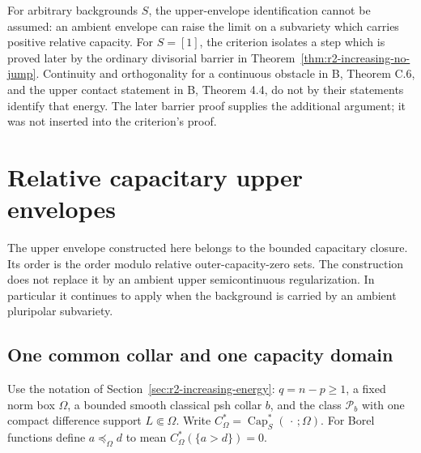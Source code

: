 \documentclass[11pt,a4paper]{article}
\numberwithin{equation}{section}
\theoremstyle{definition}
\theoremstyle{remark}
\begin{document}
For arbitrary backgrounds $S$, the upper-envelope identification
cannot be assumed: an ambient envelope can raise the limit on a
subvariety which carries positive relative capacity. For $S=[1]$,
the criterion isolates a step which is proved later by the ordinary
divisorial barrier in Theorem~\ref{thm:r2-increasing-no-jump}.
Continuity and orthogonality for a continuous obstacle in
\textup{B}, Theorem C.6, and the upper contact statement in
\textup{B}, Theorem 4.4, do not by their statements identify that
energy. The later barrier proof supplies the additional argument;
it was not inserted into the criterion's proof.



\section{Relative capacitary upper envelopes}
\label{sec:r2-capacitary-envelopes}

The upper envelope constructed here belongs to the bounded
capacitary closure. Its order is the order modulo relative
outer-capacity-zero sets. The construction does not replace it by
an ambient upper semicontinuous regularization. In particular it
continues to apply when the background is carried by an ambient
pluripolar subvariety.

\subsection{One common collar and one capacity domain}

Use the notation of Section~\ref{sec:r2-increasing-energy}:
$q=n-p\geq1$, a fixed norm box $\Omega$, a bounded smooth
classical psh collar $b$, and the class $\mathcal P_b$ with one
compact difference support $L\Subset\Omega$. Write
$C_\Omega^*=\operatorname{Cap}_S^*(\,\cdot\,;\Omega)$.
For Borel functions define $a\preceq_\Omega d$ to mean
$C_\Omega^*(\{a>d\})=0$.
\end{document}
